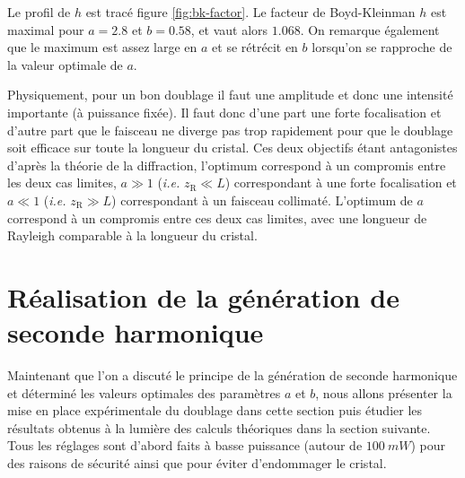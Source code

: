 \documentclass[11pt,a4paper]{article}
\newcommand{\zr}{z_\mathsc{R}}
\newcommand{\chie}{\chi_\mathsc{eff}}
\DeclareMathOperator{\sinc}{sinc}
\renewcommand{\P}{\mathscr{P}}
\newcommand{\mathsc}[1]{\mathrm{\scriptscriptstyle {#1}}}
\begin{document}
Le profil de $h$ est tracé figure \ref{fig:bk-factor}. Le facteur de Boyd-Kleinman $h$ est maximal pour $a=2.8$ et $b=0.58$, et vaut alors $1.068$. On remarque également que le maximum est assez large en $a$ et se rétrécit en $b$ lorsqu'on se rapproche de la valeur optimale de $a$.

Physiquement, pour un bon doublage il faut une amplitude et donc une intensité importante (à puissance fixée). Il faut donc d'une part une forte focalisation et d'autre part que le faisceau ne diverge pas trop rapidement pour que le doublage soit efficace sur toute la longueur du cristal. Ces deux objectifs étant antagonistes d'après la théorie de la diffraction, l'optimum correspond à un compromis entre les deux cas limites, $a\gg1$ (\textit{i.e.} $\zr \ll L$) correspondant à une forte focalisation et $a\ll1$ (\textit{i.e.} $\zr \gg L$) correspondant à un faisceau collimaté.
L'optimum de $a$ correspond à un compromis entre ces deux cas limites, avec une longueur de Rayleigh comparable à la longueur du cristal.



\section{Réalisation de la génération  de seconde harmonique}  

Maintenant que l'on a discuté le principe de la génération de seconde harmonique et déterminé les valeurs optimales des paramètres $a$ et $b$, nous allons présenter la mise en place expérimentale du doublage dans cette section puis étudier les résultats obtenus à la lumière des calculs théoriques dans la section suivante. Tous les réglages sont d'abord faits à basse puissance (autour de $\SI{100}{mW}$) pour des raisons de sécurité ainsi que pour éviter d'endommager le cristal.
\end{document}

